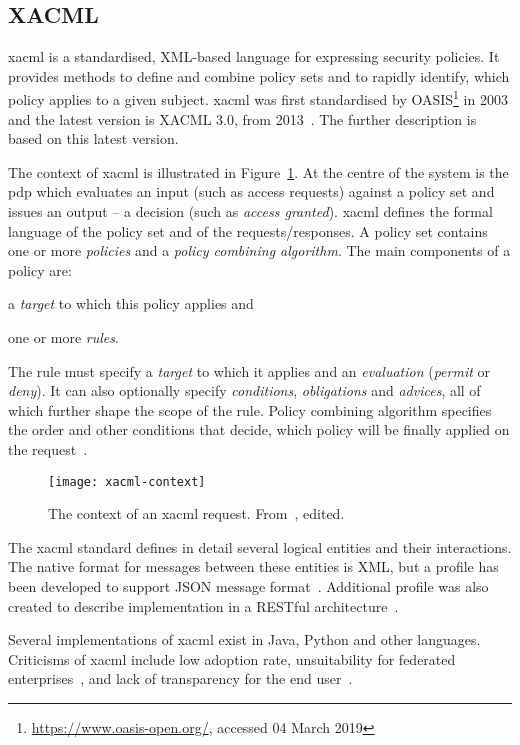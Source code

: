 \subsection{XACML}\label{sec:xacml}

 \acrfull{xacml} is a standardised, XML-based language for expressing security policies. It provides methods to define and combine policy sets and to rapidly identify, which policy applies to a given subject. \acrshort{xacml} was first standardised by OASIS\footnote{\url{https://www.oasis-open.org/}, accessed 04 March 2019} in 2003 and the latest version is XACML 3.0, from 2013~\cite{OASISStandard2013EXtensible3.0}. The further description is based on this latest version.
 
The context of \acrshort{xacml} is illustrated in Figure~\ref{fig:xacml-context}. At the centre of the system is the \acrfull{pdp} which evaluates an input (such as access requests) against a policy set and issues an output -- a decision (such as \textit{access granted}). \acrshort{xacml} defines the formal language of the policy set and of the requests/responses. A policy set contains one or more \textit{policies} and a \textit{policy combining algorithm}. The main components of a policy are:
% 
\begin{enumerate*}[label=(\roman*)]
    \item a \textit{target} to which this policy applies and
    \item one or more \textit{rules}.
\end{enumerate*} 
% 
The rule must specify a \textit{target} to which it applies and an \textit{evaluation} (\textit{permit} or \textit{deny}). It can also optionally specify \textit{conditions}, \textit{obligations} and \textit{advices}, all of which further shape the scope of the rule. Policy combining algorithm specifies the order and other conditions that decide, which policy will be finally applied on the request~\cite{OASISStandard2013EXtensible3.0}.
 
 \begin{figure}[ht]
    \centering
    \texttt{[image: xacml-context]}
    \caption{The context of an \acrshort{xacml} request. From~\cite{OASISStandard2013EXtensible3.0}, edited.}
    \label{fig:xacml-context}
\end{figure}
 
The \acrshort{xacml} standard defines in detail several logical entities and their interactions. The native format for messages between these entities is XML, but a profile has been developed to support JSON message format~\cite{2017JSON1.0}. Additional profile was also created to describe implementation in a RESTful architecture~\cite{2017REST1.0}.
 
 Several implementations of \acrshort{xacml} exist in Java, Python and other languages. Criticisms of \acrshort{xacml} include low adoption rate, unsuitability for federated enterprises~\cite{Cser2013XACMLDead}, and lack of transparency for the end user~\cite{Cser2013XACMLDead, Ardagna2011ExpressiveApplications}.

